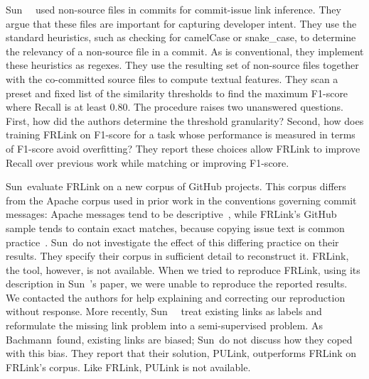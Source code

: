 Sun~\etal~\cite{FRLink} used non-source files in commits for commit-issue link
inference. They argue that these files are important for capturing developer
intent. They use the standard heuristics, such as checking for camelCase or
snake\_case, to determine the relevancy of a non-source file in a commit. As is
conventional, they implement these heuristics as regexes. They use the resulting
set of non-source files together with the co-committed source files to compute
textual features. They scan a preset and fixed list of the similarity thresholds
to find the maximum F1-score where Recall is at least 0.80. The procedure raises
two unanswered questions. First, how did the authors determine the threshold
granularity? Second, how does training FRLink on F1-score for a task whose
performance is measured in terms of F1-score avoid overfitting? They report
these choices allow FRLink to improve Recall over previous work while matching
or improving F1-score. 

Sun~\etal evaluate FRLink on a new corpus of GitHub projects. This corpus
differs from the Apache corpus used in prior work in the conventions governing
commit messages:  Apache messages tend to be descriptive~\cite{ApachePractice},
while FRLink's GitHub sample tends to contain exact matches, because copying
issue text is common practice~\cite{ruan2019deeplink}. Sun~\etal do not
investigate the effect of this differing practice on their results. They specify
their corpus in sufficient detail to reconstruct it. FRLink, the tool, however,
is not available. When we tried to reproduce FRLink, using its description in
Sun~\etal's paper, we were unable to reproduce the reported results.   
We contacted the authors for help explaining and correcting our reproduction
without response. More recently, Sun~\etal~\cite{PULink} treat existing links as
labels and reformulate the missing link problem into a semi-supervised problem.
As Bachmann~\etal found, existing links are biased; Sun~\etal do not discuss how
they coped with this bias. They report that their solution, PULink, outperforms
FRLink on FRLink's corpus. Like FRLink, PULink is not available.

